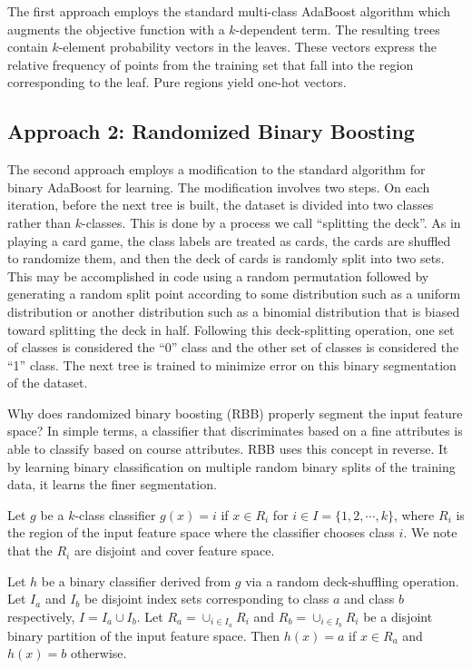 \documentclass{article}
\begin{document}
The first approach employs the standard multi-class AdaBoost algorithm which augments the objective function with a $k$-dependent term.  The resulting trees contain $k$-element probability vectors in the leaves.  These vectors express the relative frequency of points from the training set that fall into the region corresponding to the leaf.  Pure regions yield one-hot vectors.

\subsection{Approach 2: Randomized Binary Boosting}

The second approach employs a modification to the standard algorithm for binary AdaBoost for learning.  The modification involves two steps.  On each iteration, before the next tree is built, the dataset is divided into two classes rather than $k$-classes.  This is done by a process we call ``splitting the deck''.  As in playing a card game, the class labels are treated as cards, the cards are shuffled to randomize them, and then the deck of cards is randomly split into two sets.  This may be accomplished in code using a random permutation followed by generating a random split point according to some distribution such as a uniform distribution or another distribution such as a binomial distribution that is biased toward splitting the deck in half.  Following this deck-splitting operation, one set of classes is considered the ``0'' class and the other set of classes is considered the ``1'' class.  The next tree is trained to minimize error on this binary segmentation of the dataset.

Why does randomized binary boosting (RBB) properly segment the input feature space?  In simple terms, a classifier that discriminates based on a fine attributes is able to classify based on course attributes.  RBB uses this concept in reverse.  It by learning binary classification on multiple random binary splits of the training data, it learns the finer segmentation.


Let $g$ be a $k$-class classifier $g(x) = i$ if $x \in R_i$ for $i \in I = \{1, 2, \cdots, k\}$, where $R_i$ is the region of the input feature space where the classifier chooses class $i$.  We note that the $R_i$ are disjoint and cover feature space.

Let $h$ be a binary classifier derived from $g$ via a random deck-shuffling operation.  Let $I_a$ and $I_b$ be disjoint index sets corresponding to class $a$ and class $b$ respectively, $I=I_a \cup I_b$.  Let $R_a = \cup_{i \in I_a} R_i$ and $R_b = \cup_{i \in I_b} R_i$ be a disjoint binary partition of the input feature space.  Then $h(x) = a$ if $x \in R_a$ and $h(x) = b$ otherwise.
\end{document}
